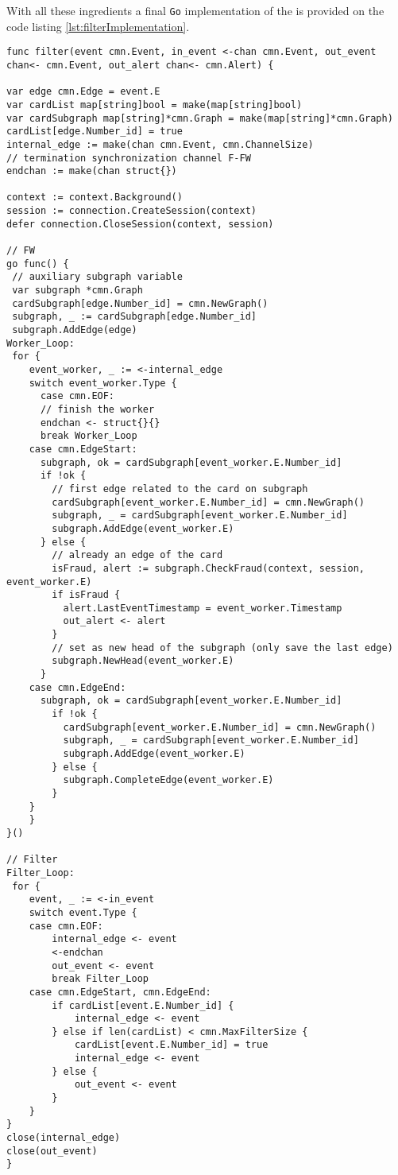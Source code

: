 With all these ingredients a final \texttt{Go} implementation of the \filter is provided on the code listing \ref{lst:filterImplementation}.

\newpage
\begin{center}
\lstset{style=golangStyle}
\begin{lstlisting}[caption={A \filter stage \texttt{Go} implementation}, label={lst:filterImplementation}]
func filter(event cmn.Event, in_event <-chan cmn.Event, out_event chan<- cmn.Event, out_alert chan<- cmn.Alert) {

var edge cmn.Edge = event.E
var cardList map[string]bool = make(map[string]bool)
var cardSubgraph map[string]*cmn.Graph = make(map[string]*cmn.Graph)
cardList[edge.Number_id] = true
internal_edge := make(chan cmn.Event, cmn.ChannelSize)
// termination synchronization channel F-FW
endchan := make(chan struct{}) 

context := context.Background() 
session := connection.CreateSession(context)
defer connection.CloseSession(context, session)

// FW 
go func() {
 // auxiliary subgraph variable
 var subgraph *cmn.Graph 
 cardSubgraph[edge.Number_id] = cmn.NewGraph()
 subgraph, _ := cardSubgraph[edge.Number_id]
 subgraph.AddEdge(edge)
Worker_Loop:
 for {
    event_worker, _ := <-internal_edge
    switch event_worker.Type {
      case cmn.EOF:
      // finish the worker
      endchan <- struct{}{}
      break Worker_Loop
    case cmn.EdgeStart:
      subgraph, ok = cardSubgraph[event_worker.E.Number_id]
      if !ok {
        // first edge related to the card on subgraph
        cardSubgraph[event_worker.E.Number_id] = cmn.NewGraph()
        subgraph, _ = cardSubgraph[event_worker.E.Number_id]
        subgraph.AddEdge(event_worker.E)
      } else {
        // already an edge of the card
        isFraud, alert := subgraph.CheckFraud(context, session, event_worker.E)
        if isFraud {
          alert.LastEventTimestamp = event_worker.Timestamp
          out_alert <- alert
        }
        // set as new head of the subgraph (only save the last edge)
        subgraph.NewHead(event_worker.E)
      }
    case cmn.EdgeEnd:
      subgraph, ok = cardSubgraph[event_worker.E.Number_id]
        if !ok {
          cardSubgraph[event_worker.E.Number_id] = cmn.NewGraph()
          subgraph, _ = cardSubgraph[event_worker.E.Number_id]
          subgraph.AddEdge(event_worker.E)
        } else {
          subgraph.CompleteEdge(event_worker.E)
        }
    }
    }
}()

// Filter
Filter_Loop:
 for {
    event, _ := <-in_event
    switch event.Type {
    case cmn.EOF:
        internal_edge <- event
        <-endchan
        out_event <- event 
        break Filter_Loop
    case cmn.EdgeStart, cmn.EdgeEnd:
        if cardList[event.E.Number_id] {
            internal_edge <- event
        } else if len(cardList) < cmn.MaxFilterSize {
            cardList[event.E.Number_id] = true
            internal_edge <- event
        } else {
            out_event <- event
        }
    }
}
close(internal_edge)
close(out_event)
}
\end{lstlisting}
\end{center}

